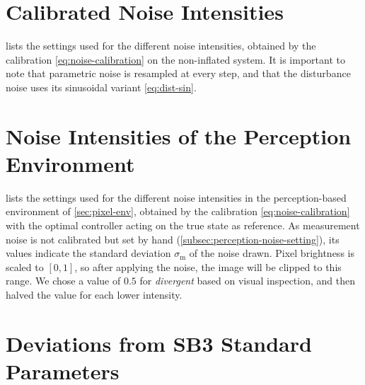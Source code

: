 \section{Calibrated Noise Intensities}
\label{sec:app-noise-levels}

 lists the settings used for the different noise intensities, obtained by the
calibration \eqref{eq:noise-calibration} on the non-inflated system.
It is important to note that parametric noise is resampled at every step,
and that the disturbance noise uses its sinusoidal variant \eqref{eq:dist-sin}.



\section{Noise Intensities of the Perception Environment}
\label{sec:app-pixel-noise-levels}

 lists the settings used for the different noise intensities in the perception-based environment
of \cref{sec:pixel-env}, obtained by the calibration \eqref{eq:noise-calibration}
with the optimal controller acting on the true state as reference. As measurement
noise is not calibrated but set by hand (\cref{subsec:perception-noise-setting}), its values
indicate the standard deviation $\sigma_{\mathrm{m}}$ of the noise drawn. Pixel brightness is scaled to
$[0, 1]$, so after applying the noise, the image will be clipped to this range. We
chose a value of $0.5$ for \emph{divergent} based on visual inspection, and then halved the value
for each lower intensity.



\section{Deviations from SB3 Standard Parameters}
\label{sec:app-rl-sb3-parameters}

